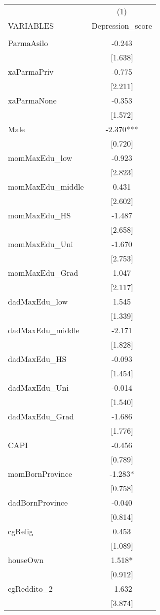 \documentclass[]{article}
\begin{document}
\begin{tabular}{lc} \hline
 & (1) \\
VARIABLES & Depression\_score \\ \hline
 &  \\
ParmaAsilo & -0.243 \\
 & [1.638] \\
xaParmaPriv & -0.775 \\
 & [2.211] \\
xaParmaNone & -0.353 \\
 & [1.572] \\
Male & -2.370*** \\
 & [0.720] \\
momMaxEdu\_low & -0.923 \\
 & [2.823] \\
momMaxEdu\_middle & 0.431 \\
 & [2.602] \\
momMaxEdu\_HS & -1.487 \\
 & [2.658] \\
momMaxEdu\_Uni & -1.670 \\
 & [2.753] \\
momMaxEdu\_Grad & 1.047 \\
 & [2.117] \\
dadMaxEdu\_low & 1.545 \\
 & [1.339] \\
dadMaxEdu\_middle & -2.171 \\
 & [1.828] \\
dadMaxEdu\_HS & -0.093 \\
 & [1.454] \\
dadMaxEdu\_Uni & -0.014 \\
 & [1.540] \\
dadMaxEdu\_Grad & -1.686 \\
 & [1.776] \\
CAPI & -0.456 \\
 & [0.789] \\
momBornProvince & -1.283* \\
 & [0.758] \\
dadBornProvince & -0.040 \\
 & [0.814] \\
cgRelig & 0.453 \\
 & [1.089] \\
houseOwn & 1.518* \\
 & [0.912] \\
cgReddito\_2 & -1.632 \\
 & [3.874] \\

\end{tabular}
\end{document}

